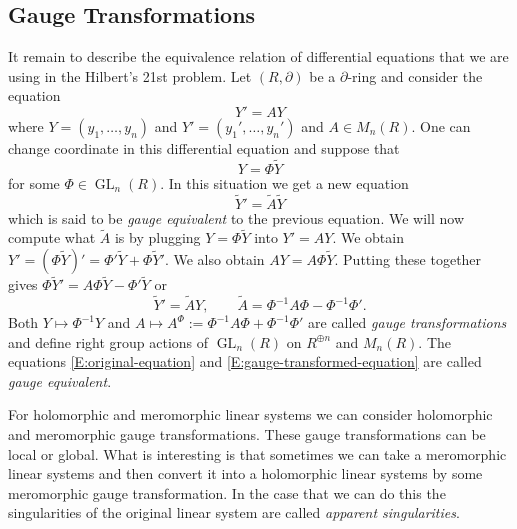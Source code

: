 \documentclass[]{book}
\numberwithin{equation}{section}
\theoremstyle{definition}
\theoremstyle{remark}
\newcommand{\GL}{\operatorname{GL}}
\begin{document}
\subsection{Gauge Transformations}
It remain to describe the equivalence relation of differential equations that we are using in the Hilbert's 21st problem.
Let $(R,\partial)$ be a $\partial$-ring and consider the equation
\begin{equation}\label{E:original-equation}
Y' = AY
\end{equation}
where $Y = (y_1,\ldots,y_n)$ and $Y' =(y_1',\ldots,y_n')$ and $A \in M_n(R)$. 
One can change coordinate in this differential equation and suppose that 
\begin{equation}\label{E:gauge-trans-one}
Y = \Phi \widetilde{Y}
\end{equation}
for some $\Phi \in \GL_n(R)$. 
In this situation we get a new equation 
\begin{equation}\label{E:gauge-transformed-equation}
\widetilde{Y}' = \widetilde{A} \widetilde{Y} 
\end{equation}
which is said to be \emph{gauge equivalent} to the previous equation. 
We will now compute what $\widetilde{A}$ is by plugging $Y = \Phi \widetilde{Y}$ into $Y'=AY$. 
We obtain $Y' = (\Phi \widetilde{Y})' = \Phi' \widetilde{Y} + \Phi \widetilde{Y}'$. 
We also obtain $AY = A\Phi \widetilde{Y}$. 
Putting these together gives $\Phi \widetilde{Y}' = A\Phi \widetilde{Y} - \Phi' \widetilde{Y}$ or 
$$ \widetilde{Y}' = \widetilde{A} Y, \qquad \widetilde{A} = \Phi^{-1} A \Phi - \Phi^{-1} \Phi '.$$
Both $Y \mapsto \Phi^{-1} Y$ and $A \mapsto A^{\Phi} := \Phi^{-1} A \Phi + \Phi^{-1} \Phi'$ are called \emph{gauge transformations} and define right group actions of $\GL_n(R)$ on $R^{\oplus n}$ and $M_n(R)$.
The equations \eqref{E:original-equation} and \eqref{E:gauge-transformed-equation} are called \emph{gauge equivalent}.

For holomorphic and meromorphic linear systems we can consider holomorphic and meromorphic gauge transformations. 
These gauge transformations can be local or global. 
What is interesting is that sometimes we can take a meromorphic linear systems and then convert it into a holomorphic linear systems by some meromorphic gauge transformation. 
In the case that we can do this the singularities of the original linear system are called \emph{apparent singularities}. 
\end{document}
